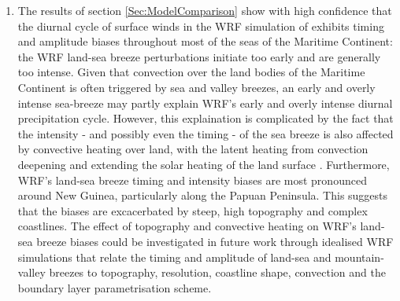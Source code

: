\documentclass[12pt]{book}
\begin{document}
\begin{enumerate}
\item
The results of section \ref{Sec:ModelComparison} show with high confidence that the diurnal cycle of surface winds in the WRF simulation of \citet{vincent16b} exhibits timing and amplitude biases throughout most of the seas of the Maritime Continent: the WRF land-sea breeze perturbations initiate too early and are generally too intense. Given that convection over the land bodies of the Maritime Continent is often triggered by sea and valley breezes, an early and overly intense sea-breeze may partly explain WRF's early and overly intense diurnal precipitation cycle. However, this explaination is complicated by the fact that the intensity - and possibly even the timing - of the sea breeze is also affected by convective heating over land, with the latent heating from convection deepening and extending the solar heating of the land surface \citep{love11}. Furthermore, WRF's land-sea breeze timing and intensity biases are most pronounced around New Guinea, particularly along the Papuan Peninsula. This suggests that the biases are excacerbated by steep, high topography and complex coastlines. The effect of topography and convective heating on WRF's land-sea breeze biases could be investigated in future work through idealised WRF simulations that relate the timing and amplitude of land-sea and mountain-valley breezes to topography, resolution, coastline shape, convection and the boundary layer parametrisation scheme.


\end{enumerate}
\end{document}
